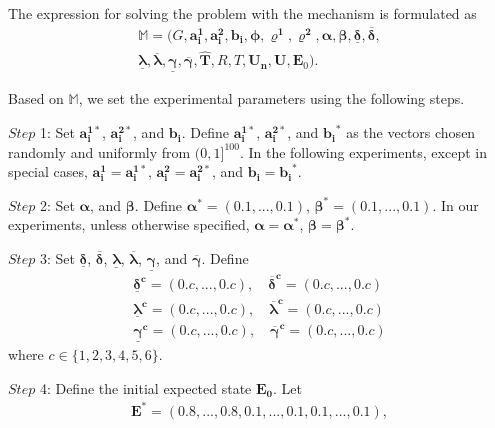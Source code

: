 \documentclass[lettersize,journal]{IEEEtran}
\begin{document}
The expression for solving the problem with the mechanism is formulated as
\begin{equation}\label{eq_PPAC-}
\begin{aligned}
\mathbb{M}=(G,\bm{a^1_i},\bm{a^2_i},\bm{b_i},\bm{\phi},\bm{\varrho^1},\bm{\varrho^2},\bm{\alpha},\bm{\beta},\bm{\underline{\delta}},\bm{\overline{\delta}},\\
\bm{\underline{\lambda}},\bm{\overline{\lambda}},\bm{\underline{\gamma}},\bm{\overline{\gamma}},\bm{\hat{T}},
R,T,\bm{U_n},\bm{U},\bm{E}_0).
   \end{aligned}
\end{equation}
\par
 Based on $\mathbb{M}$, we set the experimental parameters using the following steps. \par
 $Step$ 1: Set $\bm{a^{1*}_i}$, $\bm{a^{2*}_i}$, and $\bm{b_i}$. Define  $\bm{a^{1*}_i}$, $\bm{a^{2*}_i}$, and $\bm{b_i}^*$ as the vectors chosen randomly and uniformly from $(0, 1]^{100}$. In the following experiments, except in special cases, $\bm{a^1_i}=\bm{a^{1*}_i}$, $\bm{a^2_i}=\bm{a^{2*}_i}$, and $\bm{b_i}=\bm{b_i}^*$.\par
  $Step$ 2: Set $\bm{\alpha}$, and $\bm{\beta}$. Define $\bm{\alpha^*}=(0.1,...,0.1)$, $\bm{\beta^*}=(0.1,...,0.1)$. In our experiments, unless otherwise specified, $\bm{\alpha}=\bm{\alpha}^*$, $\bm{\beta}=\bm{\beta}^*$.\par
 $Step$ 3: Set $\bm{\underline{\delta}}$, $\bm{\overline{\delta}}$, $\bm{\underline{\lambda}}$, $\bm{\overline{\lambda}}$, $\bm{\underline{\gamma}}$, and $\bm{\overline{\gamma}}$. Define 
 \begin{equation}
	\begin{aligned}
	\bm{\underline{\delta}^c}=(0.c,...,0.c),\quad\bm{\overline{\delta}^c}=(0.c,...,0.c)\\
	\bm{\underline{\lambda}^c}=(0.c,...,0.c),\quad\bm{\overline{\lambda}^c}=(0.c,...,0.c)\\
	\bm{\underline{\gamma}^c}=(0.c,...,0.c),\quad\bm{\overline{\gamma}^c}=(0.c,...,0.c)\nonumber
	\end{aligned}
	\end{equation}
  where $c\in \{1,2,3,4,5,6\}$.\par
   $Step$ 4: Define the initial expected state $\bm{E_0}$. Let 
  \begin{equation}
	\begin{aligned}
	\bm{E}^*=(0.8,...,0.8,0.1,...,0.1,0.1,...,0.1),\nonumber
	\end{aligned}
	\end{equation}
\end{document}
